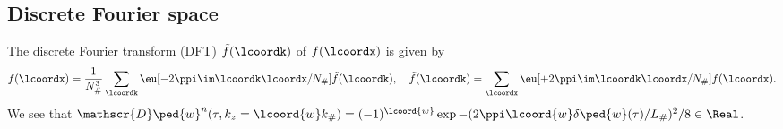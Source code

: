 \subsection{Discrete Fourier space}
    The discrete Fourier transform (DFT) $\tilde{f}(\lcoordk)$ of $f(\lcoordx)$ is given by
    \begin{equation}\label{eq:PT:gwas:DFT_definition}
        f(\lcoordx) = \frac{1}{N_\#^3} \sum_{\lcoordk } \eu[-2\ppi \im \lcoordk \lcoordx/N_\# ]\tilde{f}(\lcoordk) , \quad \tilde{f}(\lcoordk) = \sum_{\lcoordx} \eu[+2\ppi \im \lcoordk \lcoordx/N_\#  ]f(\lcoordx).
    \end{equation}
    We see that $\mathscr{D}\ped{w}^n(\tau, k_z=\lcoord{w}k_{\#}) = (-1)^{\lcoord{w}} \exp{-(2\ppi \lcoord{w} \delta\ped{w}(\tau)/L_{\#})^2/8}\in \Real$.




    









